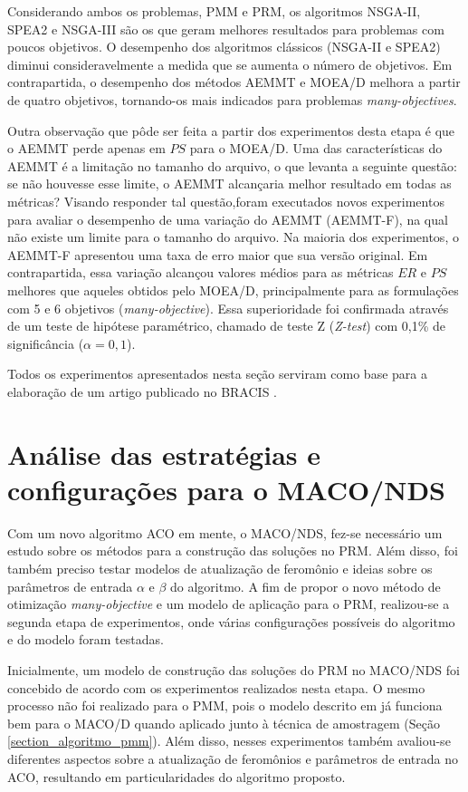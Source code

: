 Considerando ambos os problemas, PMM e PRM, os algoritmos NSGA-II, SPEA2 e NSGA-III são os que geram melhores resultados para problemas com poucos objetivos. O desempenho dos algoritmos clássicos (NSGA-II e SPEA2) diminui consideravelmente a medida que se aumenta o número de objetivos. Em contrapartida, o desempenho dos métodos AEMMT e MOEA/D melhora a partir de quatro objetivos, tornando-os mais indicados para problemas \textit{many-objectives}.

Outra observação que pôde ser feita a partir dos experimentos desta etapa é que o AEMMT perde apenas em $PS$ para o MOEA/D. Uma das características do AEMMT é a limitação no tamanho do arquivo, o que levanta a seguinte questão: se não houvesse esse limite, o AEMMT alcançaria melhor resultado em todas as métricas? Visando responder tal questão,foram executados novos experimentos para avaliar o desempenho de uma variação do AEMMT (AEMMT-F), na qual não existe um limite para o tamanho do arquivo. Na maioria dos experimentos, o AEMMT-F apresentou uma taxa de erro maior que sua versão original. Em contrapartida, essa variação alcançou valores médios para as métricas $ER$ e $PS$ melhores que aqueles obtidos pelo MOEA/D, principalmente para as formulações com 5 e 6 objetivos (\textit{many-objective}). Essa superioridade foi confirmada através de um teste de hipótese paramétrico, chamado de teste Z (\textit{Z-test}) com 0,1\% de significância ($\alpha = 0,1$).

Todos os experimentos apresentados nesta seção serviram como base para a elaboração de um artigo publicado no \ac{BRACIS} \cite{Franca2017}.

\section{Análise das estratégias e configurações para o MACO/NDS}
\label{section_experimentos_etapa2}

Com um novo algoritmo ACO em mente, o MACO/NDS, fez-se necessário um estudo sobre os métodos para a construção das soluções no PRM. Além disso, foi também preciso testar modelos de atualização de feromônio e ideias sobre os parâmetros de entrada $\alpha$ e $\beta$ do algoritmo. A fim de propor o novo método de otimização \textit{many-objective} e um modelo de aplicação para o PRM, realizou-se a segunda etapa de experimentos, onde várias configurações possíveis do algoritmo e do modelo foram testadas.

Inicialmente, um modelo de construção das soluções do PRM no MACO/NDS foi concebido de acordo com os experimentos realizados nesta etapa. O mesmo processo não foi realizado para o PMM, pois o modelo descrito em \cite{Alaya2004} já funciona bem para o MACO/D quando aplicado junto à técnica de amostragem (Seção \ref{section_algoritmo_pmm}). Além disso, nesses experimentos também avaliou-se diferentes aspectos sobre a atualização de feromônios e parâmetros de entrada no ACO, resultando em particularidades do algoritmo proposto.

